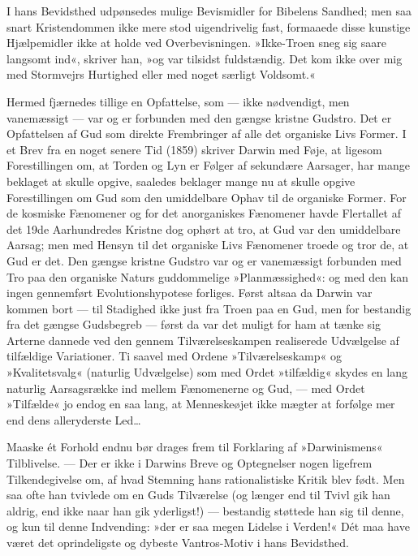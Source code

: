 \documentclass[12pt,a4paper]{article}
\begin{document}
I hans Bevidsthed udpønsedes mulige Bevismidler for Bibelens
Sandhed; men saa snart Kristendommen ikke mere stod uigendrivelig
fast, formaaede disse kunstige Hjælpemidler ikke at holde ved
Overbevisningen. »Ikke-Troen sneg sig saare langsomt ind«,
skriver han, »og var tilsidst fuldstændig. Det kom ikke over mig
med Stormvejrs Hurtighed eller med noget særligt Voldsomt.«

Hermed fjærnedes tillige en Opfattelse, som — ikke nødvendigt,
men vanemæssigt — var og er forbunden med den gængse kristne
Gudstro. Det er Opfattelsen af Gud som direkte Frembringer af
alle det organiske Livs Former. I et Brev fra en noget senere
Tid (1859) skriver Darwin med Føje, at ligesom Forestillingen
om, at Torden og Lyn er Følger af sekundære Aarsager, har mange
beklaget at skulle opgive, saaledes beklager mange nu at skulle
opgive Forestillingen om Gud som den umiddelbare Ophav til
de organiske Former. For de kosmiske Fænomener og for det
anorganiskes Fænomener havde Flertallet af det 19de Aarhundredes
Kristne dog ophørt at tro, at Gud var den umiddelbare Aarsag;
men med Hensyn til det organiske Livs Fænomener troede og tror
de, at Gud er det. Den gængse kristne Gudstro var og er
vanemæssigt forbunden med Tro paa den organiske Naturs
guddommelige »Planmæssighed«: og med den kan ingen gennemført
Evolutionshypotese forliges. Først altsaa da Darwin var kommen
bort — til Stadighed ikke just fra Troen paa en Gud, men for
bestandig fra det gængse Gudsbegreb — først da var det muligt
for ham at tænke sig Arterne dannede ved den gennem
Tilværelseskampen realiserede Udvælgelse af tilfældige
Variationer. Ti saavel med Ordene »Tilværelseskamp« og
»Kvalitetsvalg« (naturlig Udvælgelse) som med Ordet »tilfældig«
skydes en lang naturlig Aarsagsrække ind mellem Fænomenerne og
Gud, — med Ordet »Tilfælde« jo endog en saa lang, at
Menneskeøjet ikke mægter at forfølge mer end dens alleryderste
Led\ldots

Maaske ét Forhold endnu bør drages frem til Forklaring af
»Darwinismens« Tilblivelse. — Der er ikke i Darwins Breve og
Optegnelser nogen ligefrem Tilkendegivelse om, af hvad Stemning
hans rationalistiske Kritik blev født. Men saa ofte han tvivlede
om en Guds Tilværelse (og længer end til Tvivl gik han aldrig,
end ikke naar han gik yderligst!) — bestandig støttede han sig
til denne, og kun til denne Indvending: »der er saa megen Lidelse
i Verden!« Dét maa have været det oprindeligste og dybeste
Vantros-Motiv i hans Bevidsthed.
\end{document}
